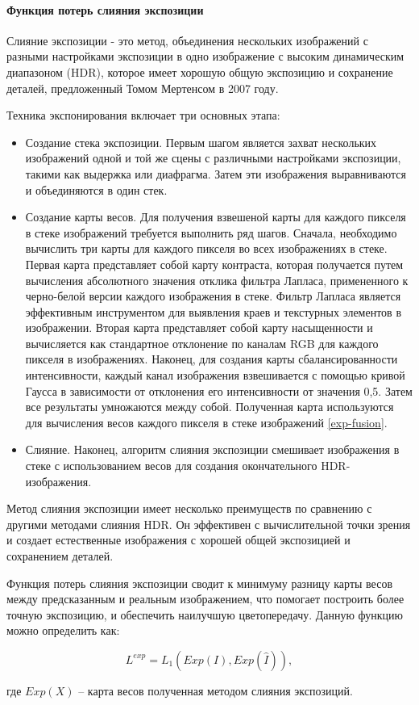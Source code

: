 \paragraph{Функция потерь слияния экспозиции}

Слияние экспозиции - это метод, объединения нескольких изображений с разными настройками экспозиции в одно изображение с высоким динамическим диапазоном (HDR), которое имеет хорошую общую экспозицию и сохранение деталей, предложенный Томом Мертенсом в 2007 году.

Техника экспонирования включает три основных этапа:

\begin{itemize}
    \item Создание стека экспозиции. Первым шагом является захват нескольких изображений одной и той же сцены с различными настройками экспозиции, такими как выдержка или диафрагма. Затем эти изображения выравниваются и объединяются в один стек.

    \item Создание карты весов. Для получения взвешеной карты для каждого пикселя в стеке изображений требуется выполнить ряд шагов. Сначала, необходимо вычислить три карты для каждого пикселя во всех изображениях в стеке. Первая карта представляет собой карту контраста, которая получается путем вычисления абсолютного значения отклика фильтра Лапласа, примененного к черно-белой версии каждого изображения в стеке. Фильтр Лапласа является эффективным инструментом для выявления краев и текстурных элементов в изображении. Вторая карта представляет собой карту насыщенности и вычисляется как стандартное отклонение по каналам RGB для каждого пикселя в изображениях. Наконец, для создания карты сбалансированности интенсивности, каждый канал изображения взвешивается с помощью кривой Гаусса в зависимости от отклонения его интенсивности от значения 0,5. Затем все результаты умножаются между собой. Полученная карта используются для вычисления весов каждого пикселя в стеке изображений \ref{exp-fusion}. 

    \item Слияние. Наконец, алгоритм слияния экспозиции смешивает изображения в стеке с использованием весов для создания окончательного HDR-изображения. 
\end{itemize}


Метод слияния экспозиции имеет несколько преимуществ по сравнению с другими методами слияния HDR. Он эффективен с вычислительной точки зрения и создает естественные изображения с хорошей общей экспозицией и сохранением деталей.

Функция потерь слияния экспозиции сводит к минимуму разницу карты весов между предсказанным и реальным изображением, что помогает построить более точную экспозицию, и обеспечить наилучшую цветопередачу. Данную функцию можно определить как:

\begin{equation}
    \label{eq:2-1-3-5}
    L^{exp} = L_1(Exp(I), Exp(\hat{I})),
\end{equation}

где $Exp(X)$ -- карта весов полученная методом слияния экспозиций.
